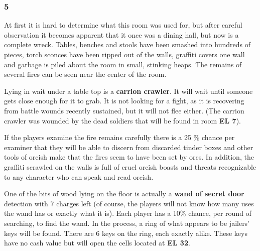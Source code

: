 \documentclass[palace_of_the_silver_princess]{subfiles}
\begin{document}
\subsubsection{5}

\begin{quotebox}
    At first it is hard to determine what this room was used for, but
    after careful observation it becomes apparent that it once was a
    dining hall, but now is a complete wreck. Tables, benches and stools
    have been smashed into hundreds of pieces, torch sconces have been
    ripped out of the walls, graffiti covers one wall and garbage is
    piled about the room in small, stinking heaps. The remains of
    several fires can be seen near the center of the room.
\end{quotebox}

Lying in wait under a table top is a \textbf{carrion crawler}.  It will
wait until someone gets close enough for it to grab. It is not looking
for a fight, as it is recovering from battle wounds recently sustained,
but it will not flee either. (The carrion crawler was wounded by the
dead soldiers that will be found in room \textbf{EL 7}).

If the players examine the fire remains carefully there is a 25 \%
chance per examiner that they will be able to discern from discarded
tinder boxes and other tools of orcish make that the fires seem to have
been set by orcs. In addition, the graffiti scrawled on the walls is
full of cruel orcish boasts and threats recognizable to any character
who can speak and read orcish.

One of the bits of wood lying on the floor is actually a \textbf{wand of
secret door} detection with 7 charges left (of course, the players will
not know how many uses the wand has or exactly what it is). Each player
has a 10\% chance, per round of searching, to find the wand. In the
process, a ring of what appears to be jailers’ keys will be found. There
are 6 keys on the ring, each exactly alike. These keys have no cash
value but will open the cells located at \textbf{EL 32}.
\end{document}
